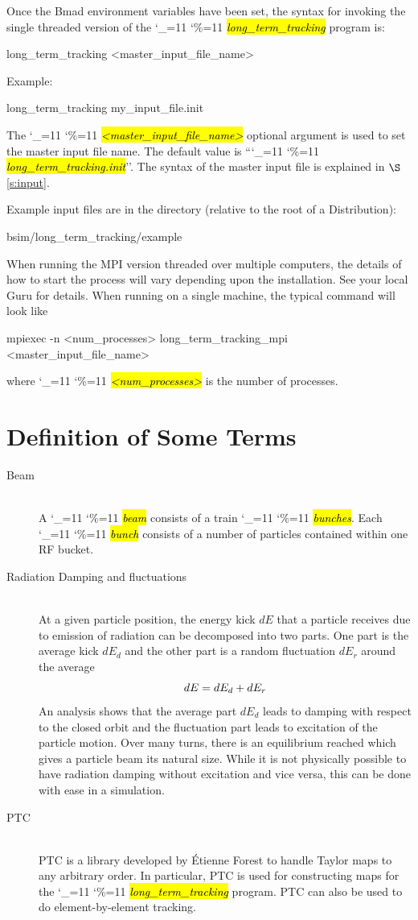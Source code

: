 \documentclass{hitec}
\newcommand\dottcmd[1]{\hl{\em#1}\endgroup}
\newcommand{\vn}{\begingroup\catcode`\_=11 \catcode`\%=11 \dottcmd}
\newcommand{\ltt}{\vn{long_term_tracking}\xspace}
\newcommand{\Newline}{\hfil \\}
\newcommand{\sref}[1]{$\S$\ref{#1}}
\newcommand{\Section}[1]{\section{#1}\vspace*{-1ex}}
\begin{document}
Once the Bmad environment variables have been set, the syntax for invoking the single threaded
version of the \ltt program is:
\begin{code}
  long_term_tracking {<master_input_file_name>}
\end{code}
Example:
\begin{code}
  long_term_tracking my_input_file.init
\end{code}
The \vn{<master_input_file_name>} optional argument is used to set the master input file name. The
default value is ``\vn{long_term_tracking.init}''. The syntax of the master input file is explained
in \sref{s:input}.

Example input files are in the directory (relative to the root of a Distribution):
\begin{code}
  bsim/long_term_tracking/example
\end{code}

When running the MPI version threaded over multiple computers, the details of how to start the process will
vary depending upon the installation. See your local Guru for details. When running on a single machine, 
the typical command will look like
\begin{code}
  mpiexec -n <num_processes> long_term_tracking_mpi {<master_input_file_name>}
\end{code}
where \vn{<num_processes>} is the number of processes. 

\Section{Definition of Some Terms}
\label{s:def}

\begin{description}
\item[Beam] \Newline
A \vn{beam} consists of a train \vn{bunches}. Each \vn{bunch} consists of a number of particles contained
within one RF bucket.
%
\item[Radiation Damping and fluctuations] \Newline
At a given particle position, the energy kick $dE$ that a particle receives due to emission of
radiation can be decomposed into two parts. One part is the average kick $dE_d$ and the other part
is a random fluctuation $dE_r$ around the average 
\begin{equation}\large
  dE = dE_d + dE_r
\end{equation}
An analysis shows that the average part $dE_d$ leads to damping with respect to the closed orbit and
the fluctuation part leads to excitation of the particle motion. Over many turns, there is an
equilibrium reached which gives a particle beam its natural size. While it is not physically
possible to have radiation damping without excitation and vice versa, this can be done with ease in
a simulation.
%
\item[PTC] \Newline
PTC is a library developed by \'Etienne Forest to handle Taylor maps to any arbitrary order. In
particular, PTC is used for constructing maps for the \vn{long_term_tracking} program. PTC can also
be used to do element-by-element tracking.
\end{description}
\end{document}
